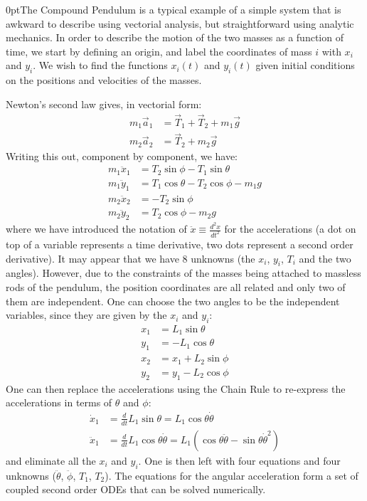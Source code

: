 \begin{example}{0pt}{The Compound Pendulum is a typical example of a simple system that is awkward to describe using vectorial analysis, but straightforward using analytic mechanics.}{}
In order to describe the motion of the two masses as a function of time, we start by defining an origin, and label the coordinates of mass $i$ with $x_i$ and $y_i$. We wish to find the functions $x_i(t)$ and $y_i(t)$ given initial conditions on the positions and velocities of the masses.

Newton's second law gives, in vectorial form:
\begin{align*}
m_1\vec{a}_1&=\vec{T}_1+\vec{T}_2+m_1\vec{g}\\
m_2\vec{a}_2&=\vec{T}_2+m_2\vec{g}
\end{align*}
Writing this out, component by component, we have:
\begin{align*}
m_1 \ddot x_1&=T_2\sin\phi-T_1\sin\theta\\
m_1 \ddot y_1&=T_1\cos\theta-T_2\cos\phi-m_1g\\
m_2 \ddot x_2&=-T_2\sin\phi\\
m_2 \ddot y_2&=T_2\cos\phi-m_2g
\end{align*}
where we have introduced the notation of $\ddot x \equiv \frac{d^2x}{dt^2}$ for the accelerations (a dot on top of a variable represents a time derivative, two dots represent a second order derivative). It may appear that we have 8 unknowns (the $x_i$, $y_i$, $T_i$ and the two angles). However, due to the constraints of the masses being attached to massless rods of the pendulum, the position coordinates are all related and only two of them are independent. One can choose the two angles to be the independent variables, since they are given by the $x_i$ and $y_i$:
\begin{align*}
x_1&=L_1\sin\theta\\
y_1&=-L_1\cos\theta\\
x_2&=x_1+L_2\sin\phi\\
y_2&=y_1-L_2\cos\phi
\end{align*}
One can then replace the accelerations using the Chain Rule to re-express the accelerations in terms of $\theta$ and $\phi$:
\begin{align*}
\dot x_1&=\frac{d}{dt}L_1\sin\theta=L_1\cos\theta\dot\theta\\
\ddot x_1&=\frac{d}{dt}L_1\cos\theta\dot\theta=L_1(\cos\theta\ddot\theta-\sin\theta\dot\theta^2)
\end{align*}
and eliminate all the $x_i$ and $y_i$. One is then left with four equations and four unknowns ($\ddot\theta$, $\ddot \phi$, $T_1$, $T_2$). The equations for the angular acceleration form a set of coupled second order ODEs that can be solved numerically.


\end{example}
